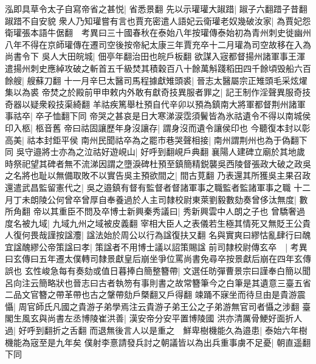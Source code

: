 泓即具草令太子自寫帝省之甚悦|{
	省悉景翻}
先以示瓘瓘大踧踖|{
	踧子六翻踖子昔翻踧踖不自安貌}
衆人乃知瓘嘗有言也賈充密遣人語妃云衛瓘老奴幾破汝家|{
	為賈妃怨衛瓘張本語牛倨翻　考異曰三十國春秋在泰始八年按瓘傳泰始初為青州刺史徙幽州八年不得在京師瓘傳在遷司空後按帝紀太康三年賈充卒十二月瓘為司空故移在入為尚書令下}
吳人大田皖城|{
	佃亭年翻治田也皖戶板翻}
欲謀入宼都督揚州諸軍事王渾遣揚州刺史應綽攻破之斬首五千級焚其積穀百八十餘萬斛踐稻田四千餘頃毁船六百餘艘|{
	艘蘇刀翻}
十一月辛巳太醫司馬程據獻雉頭裘|{
	晉志太醫屬宗正雉頭毛采炫燿集以為裘}
帝焚之於殿前甲申敕内外敢有獻奇技異服者罪之|{
	記王制作淫聲異服奇技奇器以疑衆殺技渠綺翻}
羊祜疾篤舉杜預自代辛卯以預為鎮南大將軍都督荆州諸軍事祜卒|{
	卒子恤翻下同}
帝哭之甚哀是日大寒涕涙霑須鬢皆為氷祜遺令不得以南城侯印入柩|{
	柩音舊}
帝曰祜固讓歷年身沒讓存|{
	謂身沒而遺令讓侯印也}
今聽復本封以彰高美|{
	祜本封鉅平侯}
南州民聞祜卒為之罷市巷哭聲相接|{
	南州謂荆州也為于偽翻下同}
吳守邉將士亦為之泣祜好遊峴山|{
	好呼到翻峴戶典翻}
襄陽人建碑立廟於其地歲時祭祀望其碑者無不流涕因謂之墮淚碑杜預至鎮簡精鋭襲吳西陵督張政大破之政吳之名將也耻以無備取敗不以實告吳主預欲間之|{
	間古莧翻}
乃表還其所獲吳主果召政還遣武昌監留憲代之|{
	吳之邉鎮有督有監督者督諸軍事之職監者監諸軍事之職}
十二月丁未朗陵公何曾卒曾厚自奉養過於人主司隸校尉東萊劉毅數劾奏曾侈汰無度|{
	數所角翻}
帝以其重臣不問及卒博士新興秦秀議曰|{
	秀新興雲中人朗之子也}
曾驕奢過度名被九域|{
	九域九州之域被皮義翻}
宰相大臣人之表儀若生極其情死又無貶王公貴人復何畏哉謹按諡灋|{
	諡法始於周公以行為諡復扶又翻}
名與實爽曰繆怙亂肆行曰醜宜諡醜繆公帝策諡曰孝|{
	策諡者不用博士議以詔策賜諡}
前司隸校尉傳玄卒　|{
	考異曰玄傳曰五年遷太僕轉司隸景獻皇后崩坐爭位罵尚書免尋卒按景獻后崩在四年玄傳誤也}
玄性峻急每有奏劾或值日暮捧白簡整簪帶|{
	文選任昉彈曹景宗曰謹奉白簡以聞呂向注云簡略狀也晉志曰古者執笏有事則書之故常簪筆今之白筆是其遺意三臺五省二品文官簪之帶革帶也古之鞶帶劾戶槩翻又戶得翻}
竦踊不寐坐而待旦由是貴游震懾|{
	周官師氏凡國之貴游子弟學焉注云貴游子弟王公之子弟游無官司者懾之涉翻}
臺閣生風玄與尚書左丞博陵崔洪善|{
	漢安帝分安平置博陵國}
洪亦清厲骨鯁好面折人過|{
	好呼到翻折之舌翻}
而退無後言人以是重之　鮮卑樹機能久為邉患|{
	泰始六年樹機能為宼至是九年矣}
僕射李憙請發兵討之朝議皆以為出兵重事虜不足憂|{
	朝直遥翻下同}


